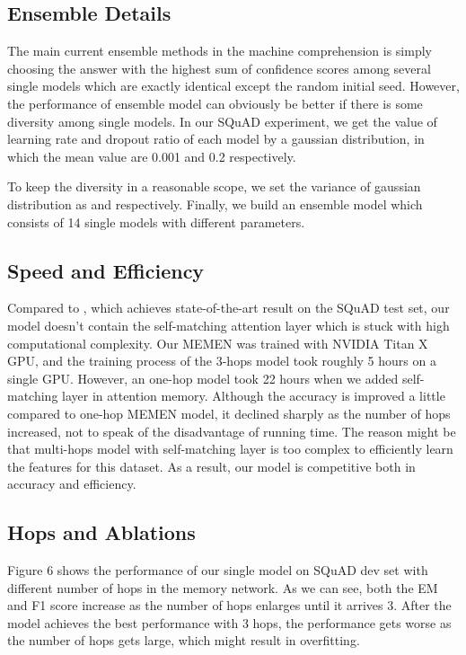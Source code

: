 \documentclass[letterpaper]{article}
\begin{document}
\subsection{Ensemble Details}
The main current ensemble methods in the machine comprehension is simply choosing the answer with the highest sum of confidence scores among several single models which are exactly identical except the random initial seed. However, the performance of ensemble model can obviously be better if there is some diversity among single models. In our SQuAD experiment, we get the value of learning rate and dropout ratio of each model by a gaussian distribution, in which the mean value are 0.001 and 0.2 respectively. 


To keep the diversity in a reasonable scope, we set the variance of gaussian distribution as  and  respectively. Finally, we build an ensemble model which consists of 14 single models with different parameters.

\subsection{Speed and Efficiency}
Compared to \citep{rnet}, which achieves state-of-the-art result on the SQuAD test set, our model doesn't contain the self-matching attention layer which is stuck with high computational complexity. Our MEMEN was trained with NVIDIA Titan X GPU, and the training process of the 3-hops model took roughly 5 hours on a single GPU. However, an one-hop model took 22 hours when we added self-matching layer in attention memory. Although the accuracy is improved a little compared to one-hop MEMEN model, it declined sharply as the number of hops increased, not to speak of the disadvantage of running time. The reason might be that multi-hops model with self-matching layer is too complex to efficiently learn the features for this dataset. As a result, our model is competitive both in accuracy and efficiency.

\subsection{Hops and Ablations}
Figure 6 shows the performance of our single model on SQuAD dev set with different number of hops in the memory network. As we can see, both the EM and F1 score increase as the number of hops enlarges until it arrives 3. After the model achieves the best performance with 3 hops, the performance gets worse as the number of hops gets large, which might result in overfitting. 
\end{document}

